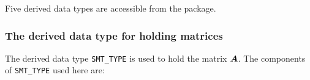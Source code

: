 \documentclass{galahad}
\begin{document}



%


\galtypes
Five derived data types are accessible from the package.


\subsubsection{The derived data type for holding matrices}\label{typesmt}
The derived data type {\tt SMT\_TYPE} is used to hold the matrix ${\bm{A}}$.
The components of {\tt SMT\_TYPE} used here are:
\end{document}
